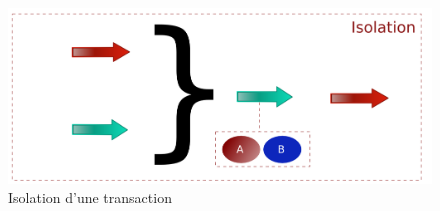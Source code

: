 {  \begin{figure}[hb]
    \begin{center}
      \includegraphics[scale=0.3]{img/tx-isolation.png}
      \caption{Isolation d'une transaction}
      \label{tx-isolation}
    \end{center}
  \end{figure}
}


